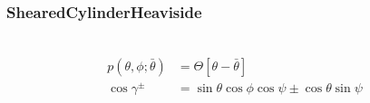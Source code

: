 \newpage
\subsubsection{ShearedCylinderHeaviside} ~\\

\begin{align}
p(\theta,\phi;\bar{\theta}) & = \Theta[\theta-\bar{\theta}] \\
\cos\gamma^\pm & = \sin\theta\cos\phi\cos\psi\pm\cos\theta\sin\psi
\end{align}

%

